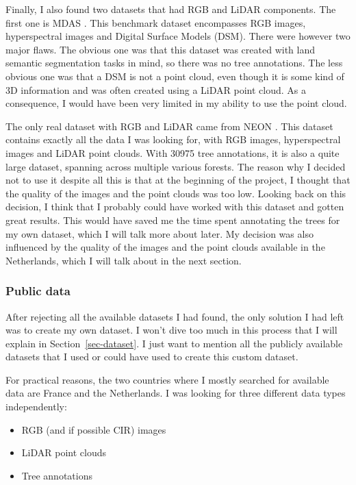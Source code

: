 \documentclass[
  letterpaper,
  DIV=11,
  numbers=noendperiod]{scrartcl}
\providecommand{\tightlist}{%
  \setlength{\itemsep}{0pt}\setlength{\parskip}{0pt}}\usepackage{longtable,booktabs,array}
\begin{document}
Finally, I also found two datasets that had RGB and LiDAR components.
The first one is MDAS \autocite{MDAS}. This benchmark dataset
encompasses RGB images, hyperspectral images and Digital Surface Models
(DSM). There were however two major flaws. The obvious one was that this
dataset was created with land semantic segmentation tasks in mind, so
there was no tree annotations. The less obvious one was that a DSM is
not a point cloud, even though it is some kind of 3D information and was
often created using a LiDAR point cloud. As a consequence, I would have
been very limited in my ability to use the point cloud.

The only real dataset with RGB and LiDAR came from NEON
\autocite{NEONdata}. This dataset contains exactly all the data I was
looking for, with RGB images, hyperspectral images and LiDAR point
clouds. With 30975 tree annotations, it is also a quite large dataset,
spanning across multiple various forests. The reason why I decided not
to use it despite all this is that at the beginning of the project, I
thought that the quality of the images and the point clouds was too low.
Looking back on this decision, I think that I probably could have worked
with this dataset and gotten great results. This would have saved me the
time spent annotating the trees for my own dataset, which I will talk
more about later. My decision was also influenced by the quality of the
images and the point clouds available in the Netherlands, which I will
talk about in the next section.

\subsubsection{Public data}\label{public-data}

After rejecting all the available datasets I had found, the only
solution I had left was to create my own dataset. I won't dive too much
in this process that I will explain in Section~\ref{sec-dataset}. I just
want to mention all the publicly available datasets that I used or could
have used to create this custom dataset.

For practical reasons, the two countries where I mostly searched for
available data are France and the Netherlands. I was looking for three
different data types independently:

\begin{itemize}
\tightlist
\item
  RGB (and if possible CIR) images
\item
  LiDAR point clouds
\item
  Tree annotations
\end{itemize}
\end{document}

